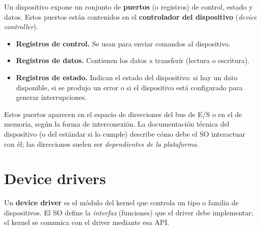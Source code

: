 \documentclass[11pt,a4paper]{article}
\begin{document}
Un dispositivo expone un conjunto de \textbf{puertos} (o registros) de
control, estado y datos. Estos puertos están contenidos en el
\textbf{controlador del dispositivo} (\emph{device controller}).

\begin{center}
\end{center}

\begin{itemize}[leftmargin=*]
    \item \textbf{Registros de control.} Se usan para enviar comandos
        al dispositivo.
    \item \textbf{Registros de datos.} Contienen los datos a transferir
        (lectura o escritura).
    \item \textbf{Registros de estado.} Indican el estado del
        dispositivo: si hay un dato disponible, si se produjo un error
        o si el dispositivo está configurado para generar interrupciones.
\end{itemize}

Estos puertos aparecen en el espacio de direcciones del bus de E/S o
en el de memoria, según la forma de interconexión. La documentación
técnica del dispositivo (o del estándar si lo cumple) describe cómo
debe el SO interactuar con él; las direcciones suelen ser
\emph{dependientes de la plataforma}.

\section{Device drivers}

\begin{definicion}
Un \textbf{device driver} es el módulo del kernel que controla un tipo
o familia de dispositivos. El SO define la \emph{interfaz} (funciones)
que el driver debe implementar; el kernel se comunica con el driver
mediante esa API.
\end{definicion}
\end{document}
